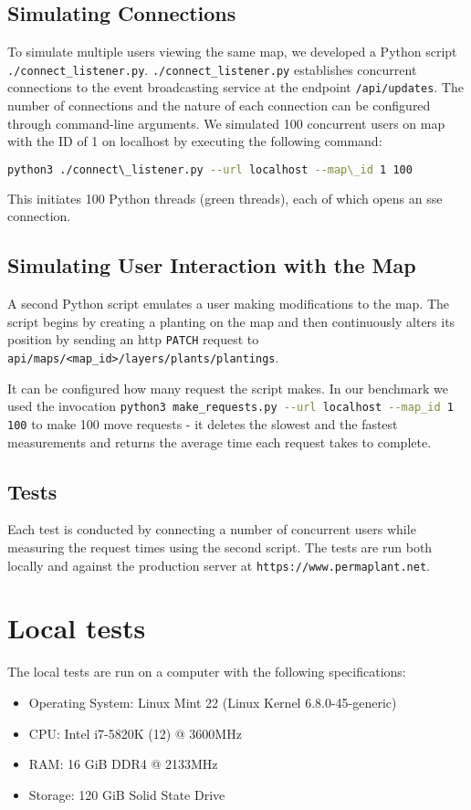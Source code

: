 \documentclass[final,oneside]{vutinfth}
\newcommand{\bashsnippet}[1]{\lstinline[language=bash]{#1}}
\newcommand{\urlsnippet}[1]{\lstinline[language=url]{#1}}
\begin{document}
\subsection{Simulating Connections}
To simulate multiple users viewing the same map, we developed a Python script \bashsnippet{./connect_listener.py}.
\texttt{./connect\_listener.py} establishes concurrent connections to the event broadcasting service at the endpoint \urlsnippet{/api/updates}.
The number of connections and the nature of each connection can be configured through command-line arguments.
We simulated 100 concurrent users on map with the ID of 1 on localhost by executing the following command: 
\begin{lstlisting}[language=sh]
python3 ./connect\_listener.py --url localhost --map\_id 1 100
\end{lstlisting}
This initiates 100 Python threads (green threads), each of which opens an \gls{sse} connection.  

\subsection{Simulating User Interaction with the Map}
A second Python script emulates a user making modifications to the map.
The script begins by creating a planting on the map and then continuously alters its position by sending an \gls{http} \texttt{PATCH} request to \urlsnippet{api/maps/<map_id>/layers/plants/plantings}.

It can be configured how many request the script makes.
In our benchmark we used the invocation \bashsnippet{python3 make_requests.py --url localhost --map_id 1 100} to make
100 move requests - it deletes the slowest and the fastest measurements and returns the average time each request takes to complete.
    
\subsection{Tests}

Each test is conducted by connecting a number of concurrent users while measuring the request times using the second script. The tests are run both locally and against the production server at \texttt{https://www.permaplant.net}.

\section{Local tests}

The local tests are run on a computer with the following specifications:
\begin{itemize}
  \item Operating System: Linux Mint 22 (Linux Kernel 6.8.0-45-generic)
  \item CPU: Intel i7-5820K (12) @ 3600MHz
  \item RAM: 16 GiB DDR4 @ 2133MHz
  \item Storage: 120 GiB Solid State Drive
\end{itemize}
\end{document}
